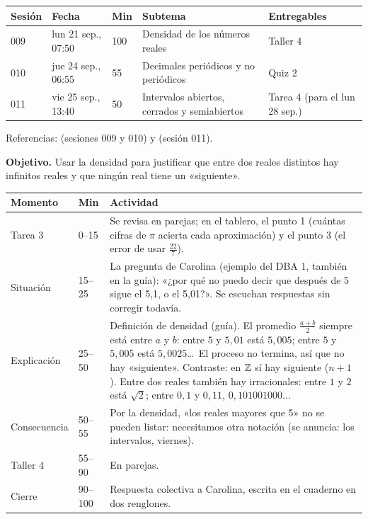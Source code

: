 \documentclass[11pt]{article}
\begin{document}
\encabezado*

\begin{center}
{\renewcommand{\arraystretch}{1.3}
\begin{tabularx}{\linewidth}{@{}l l l X l@{}}
  \toprule
  \textbf{Sesión} & \textbf{Fecha} & \textbf{Min} & \textbf{Subtema} & \textbf{Entregables}\\
  \midrule
  009 & lun 21 sep., 07:50 & 100 & Densidad de los números reales & Taller 4\\
  010 & jue 24 sep., 06:55 & 55  & Decimales periódicos y no periódicos & Quiz 2\\
  011 & vie 25 sep., 13:40 & 50  & Intervalos abiertos, cerrados y semiabiertos & Tarea 4 (para el lun 28 sep.)\\
  \bottomrule
\end{tabularx}}
\end{center}

Referencias:  (sesiones 009 y 010) y 
(sesión 011).


\textbf{Objetivo.} Usar la densidad para justificar que entre dos reales distintos hay
infinitos reales y que ningún real tiene un «siguiente».

\begin{center}
{\renewcommand{\arraystretch}{1.3}
\begin{tabularx}{\linewidth}{@{}l l X@{}}
  \toprule
  \textbf{Momento} & \textbf{Min} & \textbf{Actividad}\\
  \midrule
  Tarea 3 & 0–15 & Se revisa en parejas; en el tablero, el punto 1 (cuántas cifras de $\pi$
    acierta cada aproximación) y el punto 3 (el error de usar $\frac{22}{7}$).\\
  Situación & 15–25 & La pregunta de Carolina (ejemplo del DBA 1, también en la guía): «¿por
    qué no puedo decir que después de 5 sigue el 5,1, o el 5,01?». Se escuchan respuestas
    sin corregir todavía.\\
  Explicación & 25–50 & Definición de densidad (guía). El promedio $\frac{a+b}{2}$ siempre está
    entre $a$ y $b$: entre $5$ y $5{,}01$ está $5{,}005$; entre $5$ y $5{,}005$ está
    $5{,}0025$\ldots\ El proceso no termina, así que no hay «siguiente». Contraste: en $\mathbb{Z}$
    sí hay siguiente ($n + 1$). Entre dos reales también hay irracionales: entre $1$ y $2$
    está $\sqrt{2}$; entre $0{,}1$ y $0{,}11$, $0{,}101001000\ldots$\\
  Consecuencia & 50–55 & Por la densidad, «los reales mayores que 5» no se pueden listar:
    necesitamos otra notación (se anuncia: los intervalos, viernes).\\
  Taller 4 & 55–90 & En parejas.\\
  Cierre & 90–100 & Respuesta colectiva a Carolina, escrita en el cuaderno en dos renglones.\\
  \bottomrule
\end{tabularx}}
\end{center}
\end{document}
